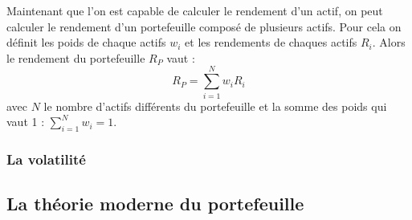 Maintenant que l'on est capable de calculer le rendement d'un actif, on peut calculer le rendement d'un portefeuille composé de plusieurs actifs. Pour cela on définit les poids de chaque actifs $w_i$ et les rendements de chaques actifs $R_i$. Alors le rendement du portefeuille $R_P$ vaut :
\[ R_P = \sum_{i=1}^{N}w_iR_i\]
avec $N$ le nombre d'actifs différents du portefeuille et la somme des poids qui vaut 1 : \(\sum_{i=1}^{N}w_i =1\).

\subsubsection{La volatilité}







\subsection{La théorie moderne du portefeuille}

